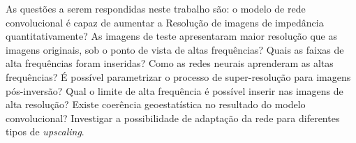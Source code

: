 % 
% 
% 
% 
% 
% 

As questões a serem respondidas neste trabalho são: o modelo de rede convolucional é capaz de aumentar a Resolução de imagens de impedância
quantitativamente? As imagens de teste apresentaram maior resolução que as imagens originais, sob o ponto 
de vista de altas frequências? Quais as faixas de alta frequências foram inseridas? Como as redes neurais aprenderam
as altas frequências? É possível parametrizar o processo de super-resolução para imagens pós-inversão?
Qual o limite de alta frequência é possível inserir nas imagens de alta resolução? Existe coerência geoestatística
no resultado do modelo convolucional? Investigar a possibilidade de adaptação da rede para diferentes tipos de \textit{upscaling}.



